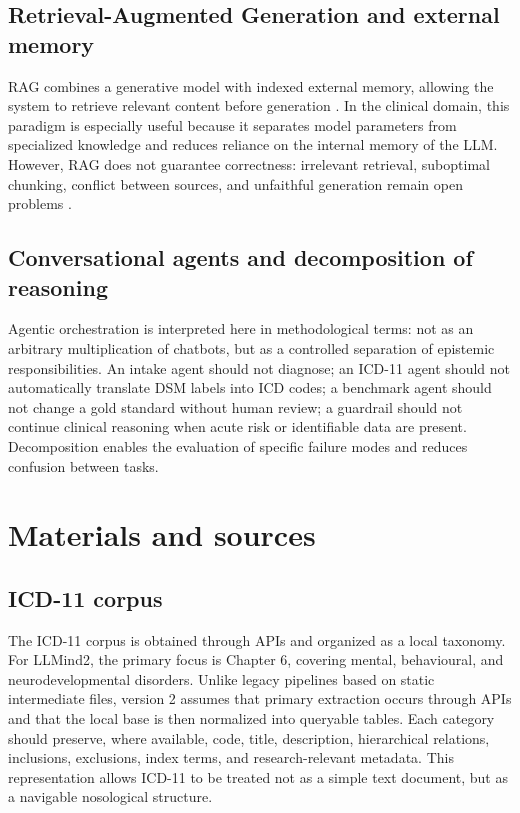 \documentclass[11pt,a4paper]{article}
\newcommand{\llmind}{LLMind2}
\begin{document}
\subsection{Retrieval-Augmented Generation and external memory}
RAG combines a generative model with indexed external memory, allowing the system to retrieve relevant content before generation \citep{lewis2020rag}. In the clinical domain, this paradigm is especially useful because it separates model parameters from specialized knowledge and reduces reliance on the internal memory of the LLM. However, RAG does not guarantee correctness: irrelevant retrieval, suboptimal chunking, conflict between sources, and unfaithful generation remain open problems \citep{li2022survey}.

\subsection{Conversational agents and decomposition of reasoning}
Agentic orchestration is interpreted here in methodological terms: not as an arbitrary multiplication of chatbots, but as a controlled separation of epistemic responsibilities. An intake agent should not diagnose; an ICD-11 agent should not automatically translate DSM labels into ICD codes; a benchmark agent should not change a gold standard without human review; a guardrail should not continue clinical reasoning when acute risk or identifiable data are present. Decomposition enables the evaluation of specific failure modes and reduces confusion between tasks.

\section{Materials and sources}
\subsection{ICD-11 corpus}
The ICD-11 corpus is obtained through APIs and organized as a local taxonomy. For \llmind, the primary focus is Chapter 6, covering mental, behavioural, and neurodevelopmental disorders. Unlike legacy pipelines based on static intermediate files, version 2 assumes that primary extraction occurs through APIs and that the local base is then normalized into queryable tables. Each category should preserve, where available, code, title, description, hierarchical relations, inclusions, exclusions, index terms, and research-relevant metadata. This representation allows ICD-11 to be treated not as a simple text document, but as a navigable nosological structure.
\end{document}
